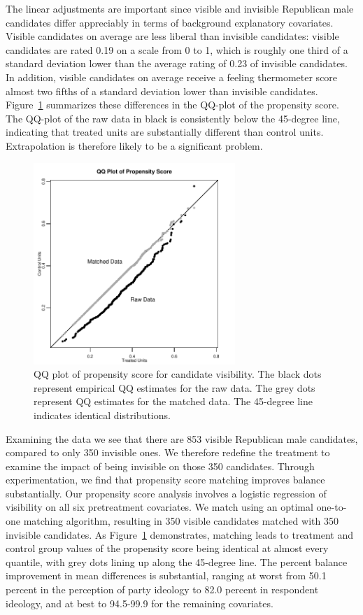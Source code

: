 \documentclass[11pt,titlepage]{article}
\begin{document}
The linear adjustments are important since visible and invisible
Republican male candidates differ appreciably in terms of background
explanatory covariates.  Visible candidates on average are less
liberal than invisible candidates: visible candidates are rated 0.19
on a scale from 0 to 1, which is roughly one third of a standard
deviation lower than the average rating of 0.23 of invisible
candidates.  In addition, visible candidates on average receive a
feeling thermometer score almost two fifths of a standard deviation
lower than invisible candidates.  Figure~\ref{fg:kochQQ} summarizes
these differences in the QQ-plot of the propensity score.  The QQ-plot
of the raw data in black is consistently below the 45-degree line,
indicating that treated units are substantially different than control
units.  Extrapolation is therefore likely to be a significant problem.
\begin{figure}[t] 
 \begin{center}
   \includegraphics[height=3in,angle=0]{figs/kochqq.pdf}
 \end{center} 
 \vspace{-0.275in}
 \caption{QQ plot of propensity score for candidate visibility. The
   black dots represent empirical QQ estimates for the raw data.  The
   grey dots represent QQ estimates for the matched data.  The
   45-degree line indicates identical distributions.}
 \label{fg:kochQQ}
\end{figure}

Examining the data we see that there are 853 visible Republican male
candidates, compared to only 350 invisible ones.  We therefore
redefine the treatment to examine the impact of being invisible on
those 350 candidates.  Through experimentation, we find that
propensity score matching improves balance substantially.  Our
propensity score analysis involves a logistic regression of visibility
on all six pretreatment covariates.  We match using an optimal
one-to-one matching algorithm, resulting in 350 visible candidates
matched with 350 invisible candidates.  As Figure~\ref{fg:kochQQ}
demonstrates, matching leads to treatment and control group values of
the propensity score being identical at almost every quantile, with
grey dots lining up along the 45-degree line.  The percent balance
improvement in mean differences is substantial, ranging at worst from
50.1 percent in the perception of party ideology to 82.0 percent in
respondent ideology, and at best to 94.5-99.9 for the remaining
covariates.
\end{document}
